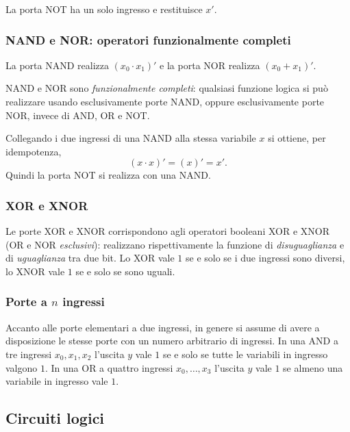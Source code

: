 \documentclass[11pt,a4paper]{article}
\begin{document}
La porta NOT ha un solo ingresso e restituisce $x'$.

\subsubsection{NAND e NOR: operatori funzionalmente completi}

La porta NAND realizza $(x_0 \cdot x_1)'$ e la porta NOR realizza $(x_0 + x_1)'$.

\begin{proposizione}
NAND e NOR sono \emph{funzionalmente completi}: qualsiasi funzione logica si può realizzare usando esclusivamente porte NAND, oppure esclusivamente porte NOR, invece di AND, OR e NOT.
\end{proposizione}

\begin{esempio}
Collegando i due ingressi di una NAND alla stessa variabile $x$ si ottiene, per idempotenza,
\[
(x \cdot x)' = (x)' = x'.
\]
Quindi la porta NOT si realizza con una NAND.
\end{esempio}

\subsubsection{XOR e XNOR}

Le porte XOR e XNOR corrispondono agli operatori booleani XOR e XNOR (OR e NOR \emph{esclusivi}): realizzano rispettivamente la funzione di \emph{disuguaglianza} e di \emph{uguaglianza} tra due bit. Lo XOR vale $1$ se e solo se i due ingressi sono diversi, lo XNOR vale $1$ se e solo se sono uguali.

\subsubsection{Porte a $n$ ingressi}

Accanto alle porte elementari a due ingressi, in genere si assume di avere a disposizione le stesse porte con un numero arbitrario di ingressi. In una AND a tre ingressi $x_0, x_1, x_2$ l'uscita $y$ vale $1$ se e solo se tutte le variabili in ingresso valgono $1$. In una OR a quattro ingressi $x_0, \dots, x_3$ l'uscita $y$ vale $1$ se almeno una variabile in ingresso vale $1$.

\subsection{Circuiti logici}
\end{document}
